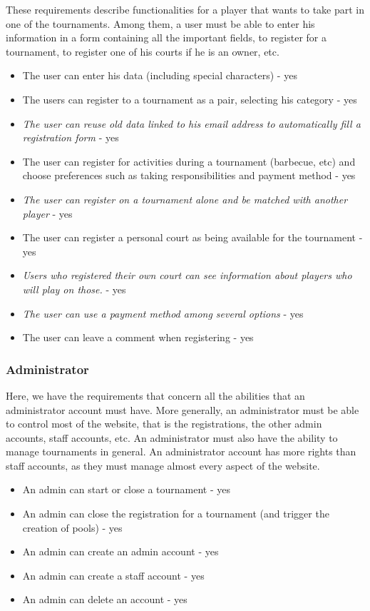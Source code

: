 \documentclass[a4paper, 12pt]{article}
\begin{document}
	These requirements describe functionalities for a player that wants to take part in one of the tournaments. Among them, a user must be able to enter his information in a form containing all the important fields, to register for a tournament, to register one of his courts if he is an owner, etc.\\
	
	\begin{itemize}
		\item The user can enter his data (including special characters) - yes
		\item The users can register to a tournament as a pair, selecting his category - yes
		\item \textit{The user can reuse old data linked to his email address to automatically fill a registration form} - yes
		\item The user can register for activities during a tournament (barbecue, etc) and choose preferences such as taking responsibilities and payment method - yes
		\item \textit{The user can register on a tournament alone and be matched with another player} - yes
		\item The user can register a personal court as being available for the tournament - yes
		\item \textit{Users who registered their own court can see information about players who will play on those.} - yes
		\item \textit{The user can use a payment method among several options} - yes
		\item The user can leave a comment when registering - yes
	\end{itemize}

\subsubsection*{Administrator}
    Here, we have the requirements that concern all the abilities that an administrator account must have. More generally, an administrator must be able to control most of the website, that is the registrations, the other admin accounts, staff accounts, etc. An administrator must also have the ability to manage tournaments in general. An administrator account has more rights than staff accounts, as they must manage almost every aspect of the website.\\ 
    
    \begin{itemize}
    	\item An admin can start or close a tournament - yes
    	\item An admin can close the registration for a tournament (and trigger the creation of pools) - yes
    	\item An admin can create an admin account - yes
		\item An admin can create a staff account - yes
		\item An admin can delete an account - yes

    \end{itemize}
    
\end{document}
